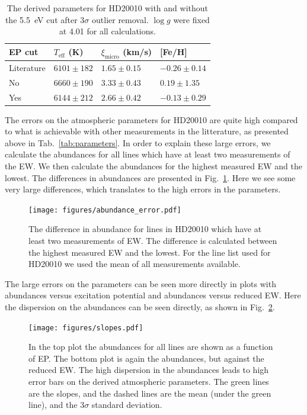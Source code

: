 \documentclass{aa}
\begin{document}
\begin{table}[htb!]
    \caption{The derived parameters for HD20010 with and without the
    \SI{5.5}{eV} cut after 3$\sigma$ outlier removal. $\log g$ were fixed at
    4.01 for all calculations.}
    \label{tab:hd20010}
    \centering
    \begin{tabular}{llll}
      \hline\hline
        EP cut       & $T_\mathrm{eff}$ (K) & $\xi_\mathrm{micro}$ (km/s)  & [Fe/H]           \\
      \hline
        Literature   & $6101 \pm 182$       & $1.65 \pm0.15$               & $-0.26 \pm 0.14$ \\
      \hline
            No       & $6660 \pm 190$       & $3.33 \pm 0.43$              & $0.19 \pm 1.35$  \\
            Yes      & $6144 \pm 212$       & $2.66 \pm 0.42$              & $-0.13 \pm 0.29$ \\
      \hline
    \end{tabular}
\end{table}

The errors on the atmospheric parameters for HD20010 are quite high
compared to what is achievable with other measurements in the litterature,
as presented above in Tab.~\ref{tab:parameters}. In order to explain these large errors, we calculate
the abundances for all lines which have at least two measurements of the EW.
We then calculate the abundances for the highest measured EW and the lowest.
The differences in abundances are presented in Fig.~\ref{fig:abundance_error}. Here we see
some very large differences, which translates to the high errors in the parameters.

\begin{figure}[tpb!]
    \centering
    \texttt{[image: figures/abundance\_error.pdf]}
    \caption{The difference in abundance for lines in HD20010 which have at
    least two measurements of EW. The difference is calculated between the
    highest measured EW and the lowest. For the line list used for HD20010
    we used the mean of all measurements available.}
    \label{fig:abundance_error}
\end{figure}

The large errors on the parameters can be seen more directly in plots with
abundances versus excitation potential and abundances versus reduced EW.
Here the dispersion on the abundances can be seen directly, as shown in
Fig.~\ref{fig:slopes}.

\begin{figure}[tpb!]
    \centering
    \texttt{[image: figures/slopes.pdf]}
    \caption{In the top plot the  abundances for all lines are
    shown as a function of EP. The bottom plot is again the 
    abundances, but against the reduced EW. The high dispersion in the abundances
    leads to high error bars on the derived atmospheric parameters. The green
    lines are the slopes, and the dashed lines are the mean (under the green line),
    and the $3 \sigma$ standard deviation.}
    \label{fig:slopes}
\end{figure}
\end{document}
